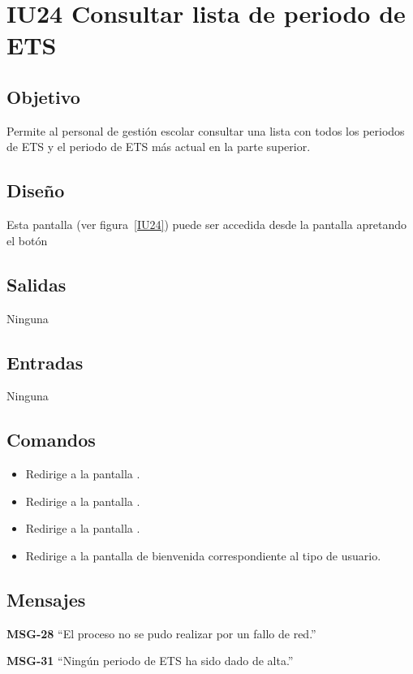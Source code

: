 
\section{IU24 Consultar lista de periodo de ETS}
\subsection{Objetivo}
   Permite al personal de gestión escolar consultar una lista con todos los periodos de ETS y el periodo de ETS más actual en la parte superior.
\subsection{Diseño}
    Esta pantalla  (ver figura~\ref{IU24}) puede ser accedida desde la pantalla  apretando el botón 

\subsection{Salidas}
Ninguna
\subsection{Entradas}
Ninguna
\subsection{Comandos}
\begin{itemize}
    \item {} Redirige a la pantalla .
    \item {} Redirige a la pantalla .
    \item {} Redirige a la pantalla .
    \item {} Redirige a la pantalla de bienvenida correspondiente al tipo de usuario.
    
\end{itemize}

\subsection{Mensajes}

\begin{Citemize}
    \item {\bf MSG-28}  ``El proceso no se pudo realizar por un fallo de red.''
    \item {\bf MSG-31}  ``Ningún periodo de ETS ha sido dado de alta.''
\end{Citemize}


